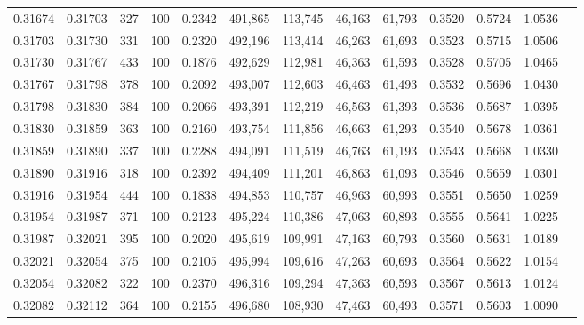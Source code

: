 \begin{tabular}{rrrrrrrrrrrrr}
0.31674 & 0.31703 &   327 & 100 &                                     0.2342 & 491,865 & 113,745 &  46,163 &  61,793 & 0.3520 & 0.5724 & 1.0536 \\
0.31703 & 0.31730 &   331 & 100 &                                     0.2320 & 492,196 & 113,414 &  46,263 &  61,693 & 0.3523 & 0.5715 & 1.0506 \\
0.31730 & 0.31767 &   433 & 100 &                                     0.1876 & 492,629 & 112,981 &  46,363 &  61,593 & 0.3528 & 0.5705 & 1.0465 \\
0.31767 & 0.31798 &   378 & 100 &                                     0.2092 & 493,007 & 112,603 &  46,463 &  61,493 & 0.3532 & 0.5696 & 1.0430 \\
0.31798 & 0.31830 &   384 & 100 &                                     0.2066 & 493,391 & 112,219 &  46,563 &  61,393 & 0.3536 & 0.5687 & 1.0395 \\
0.31830 & 0.31859 &   363 & 100 &                                     0.2160 & 493,754 & 111,856 &  46,663 &  61,293 & 0.3540 & 0.5678 & 1.0361 \\
0.31859 & 0.31890 &   337 & 100 &                                     0.2288 & 494,091 & 111,519 &  46,763 &  61,193 & 0.3543 & 0.5668 & 1.0330 \\
0.31890 & 0.31916 &   318 & 100 &                                     0.2392 & 494,409 & 111,201 &  46,863 &  61,093 & 0.3546 & 0.5659 & 1.0301 \\
0.31916 & 0.31954 &   444 & 100 &                                     0.1838 & 494,853 & 110,757 &  46,963 &  60,993 & 0.3551 & 0.5650 & 1.0259 \\
0.31954 & 0.31987 &   371 & 100 &                                     0.2123 & 495,224 & 110,386 &  47,063 &  60,893 & 0.3555 & 0.5641 & 1.0225 \\
0.31987 & 0.32021 &   395 & 100 &                                     0.2020 & 495,619 & 109,991 &  47,163 &  60,793 & 0.3560 & 0.5631 & 1.0189 \\
0.32021 & 0.32054 &   375 & 100 &                                     0.2105 & 495,994 & 109,616 &  47,263 &  60,693 & 0.3564 & 0.5622 & 1.0154 \\
0.32054 & 0.32082 &   322 & 100 &                                     0.2370 & 496,316 & 109,294 &  47,363 &  60,593 & 0.3567 & 0.5613 & 1.0124 \\
0.32082 & 0.32112 &   364 & 100 &                                     0.2155 & 496,680 & 108,930 &  47,463 &  60,493 & 0.3571 & 0.5603 & 1.0090 \\

\end{tabular}

